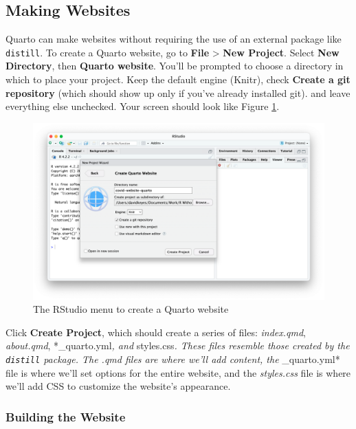 \documentclass[
]{book}
\begin{document}
\hypertarget{making-websites}{%
\subsection*{Making Websites}\label{making-websites}}

Quarto can make websites without requiring the use of an external package like \texttt{distill}. To create a Quarto website, go to \textbf{File} \textgreater{} \textbf{New Project}. Select \textbf{New Directory}, then \textbf{Quarto website}. You'll be prompted to choose a directory in which to place your project. Keep the default engine (Knitr), check \textbf{Create a git repository} (which should show up only if you've already installed git). and leave everything else unchecked. Your screen should look like Figure \ref{fig:create-quarto-website}.

\begin{figure}
\includegraphics[width=1\linewidth]{assets/create-quarto-website} \caption{The RStudio menu to create a Quarto website}\label{fig:create-quarto-website}
\end{figure}

Click \textbf{Create Project}, which should create a series of files: \emph{index.qmd}, \emph{about.qmd}, *\_quarto.yml\emph{, and }styles.css\emph{. These files resemble those created by the \texttt{distill} package. The .qmd files are where we'll add content, the }\_quarto.yml* file is where we'll set options for the entire website, and the \emph{styles.css} file is where we'll add CSS to customize the website's appearance.

\hypertarget{building-the-website}{%
\subsubsection*{Building the Website}\label{building-the-website}}
\end{document}
